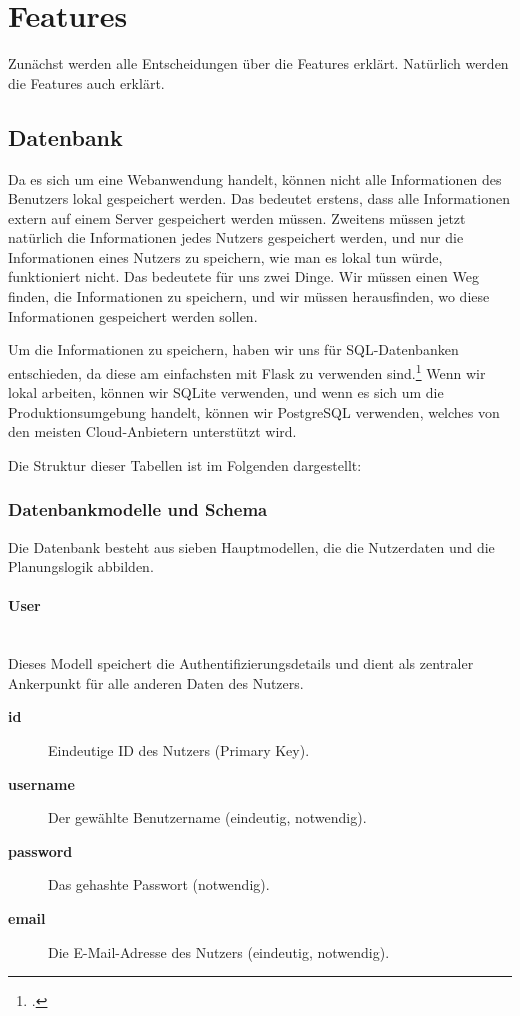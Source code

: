 \documentclass[12pt,a4paper]{report}
\newcommand{\myparagraph}[1]{\paragraph{#1}\mbox{}\\}
\begin{document}
\section{Features}
Zunächst werden alle Entscheidungen über die Features erklärt. Natürlich werden die Features auch erklärt.

\subsection{Datenbank}
Da es sich um eine Webanwendung handelt, können nicht alle Informationen des Benutzers lokal gespeichert werden. Das bedeutet erstens, dass alle Informationen extern auf einem Server gespeichert werden müssen. Zweitens müssen jetzt natürlich die Informationen jedes Nutzers gespeichert werden, und nur die Informationen eines Nutzers zu speichern, wie man es lokal tun würde, funktioniert nicht. Das bedeutete für uns zwei Dinge. Wir müssen einen Weg finden, die Informationen zu speichern, und wir müssen herausfinden, wo diese Informationen gespeichert werden sollen.

Um die Informationen zu speichern, haben wir uns für SQL-Datenbanken entschieden, da diese am einfachsten mit Flask zu verwenden sind.\footcite{flask_database_tutorial} Wenn wir lokal arbeiten, können wir SQLite verwenden, und wenn es sich um die Produktionsumgebung handelt, können wir PostgreSQL verwenden, welches von den meisten Cloud-Anbietern unterstützt wird.

Die Struktur dieser Tabellen ist im Folgenden dargestellt:

\subsubsection{Datenbankmodelle und Schema}

Die Datenbank besteht aus sieben Hauptmodellen, die die Nutzerdaten und die Planungslogik abbilden.

\myparagraph{User}
Dieses Modell speichert die Authentifizierungsdetails und dient als zentraler Ankerpunkt für alle anderen Daten des Nutzers.
\begin{description}
    \item[\textbf{id}] Eindeutige ID des Nutzers (Primary Key).
    \item[\textbf{username}] Der gewählte Benutzername (eindeutig, notwendig).
    \item[\textbf{password}] Das gehashte Passwort (notwendig).
    \item[\textbf{email}] Die E-Mail-Adresse des Nutzers (eindeutig, notwendig).
\end{description}
\end{document}
